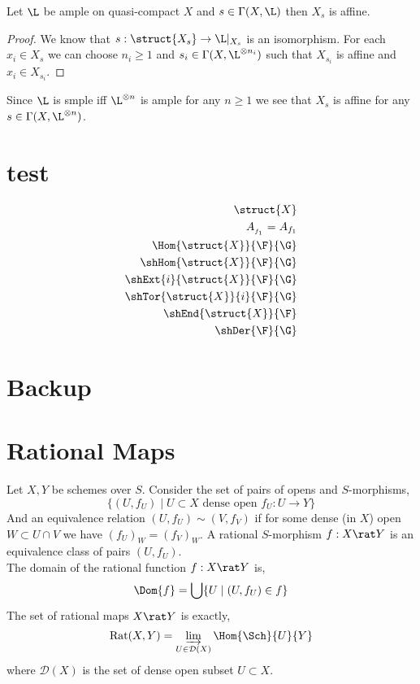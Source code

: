 \documentclass[12pt]{article}
\begin{document}
\begin{theorem}
Let $\L$ be ample on quasi-compact $X$ and $s \in \Gamma(X, \L)$ then $X_s$ is affine.
\end{theorem}

\begin{proof}
We know that $s : \struct{X_s} \to \L|_{X_s}$ is an isomorphism. For each $x_i \in X_s$ we can choose $n_i \ge 1$ and $s_i \in \Gamma(X, \L^{\otimes n_i})$ such that $X_{s_i}$ is affine and $x_i \in X_{s_i}$.  
\end{proof}

\begin{rmk}
Since $\L$ is smple iff $\L^{\otimes n}$ is ample for any $n \ge 1$ we see that $X_s$ is affine for any $s \in \Gamma(X, \L^{\otimes n})$. 
\end{rmk}

\section{test}

\begin{align*}
\struct{X}
\\
A_{_{f_1}} = A_{f_1}
\\
\Hom{\struct{X}}{\F}{\G}
\\
\shHom{\struct{X}}{\F}{\G}
\\
\shExt{i}{\struct{X}}{\F}{\G}
\\
\shTor{\struct{X}}{i}{\F}{\G}
\\
\shEnd{\struct{X}}{\F}
\\
\shDer{\F}{\G}
\end{align*}

\section{Backup}

\section{Rational Maps}

\begin{definition}
Let $X, Y$ be schemes over $S$. Consider the set of pairs of opens and $S$-morphisms,
\[ \{ (U, f_U) \mid U \subset X \text{ dense open } f_U : U \to Y \} \]
And an equivalence relation $(U, f_U) \sim (V, f_V)$ if for some dense (in $X$) open $W \subset U \cap V$ we have $(f_U)_{W} = (f_V)_{W}$. A rational $S$-morphism $f : X \rat Y$ is an equivalence class of pairs $(U, f_U)$. 
\bigskip\\
The domain of the rational function $f : X \rat Y$ is,
\[ \Dom{f} = \bigcup \{ U \mid (U, f_U) \in f \} \]
The set of rational maps $X \rat Y$ is exactly,
\[ \mathrm{Rat}(X, Y) = \varinjlim_{U \in \mathcal{D}(X)} \Hom{\Sch}{U}{Y} \]
where $\mathcal{D}(X)$ is the set of dense open subset $U \subset X$.
\end{definition}
\end{document}
